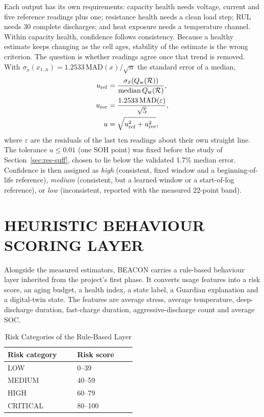 Each output has its own requirements: capacity health needs voltage, current and five reference readings plus one; resistance health needs a clean load step; RUL needs 30 complete discharges; and heat exposure needs a temperature channel. Within capacity health, confidence follows consistency. Because a healthy estimate keeps changing as the cell ages, stability of the estimate is the wrong criterion. The question is whether readings agree once that trend is removed. With $\sigma_{\tilde x}(x_{1..n}) = 1.2533\,\mathrm{MAD}(x)/\sqrt{n}$ the standard error of a median,
\begin{align}
u_\mathrm{ref} &= \frac{\sigma_{\tilde x}\!\left(Q_{\mathrm{w}}(\mathcal{R})\right)}{\operatorname{median}Q_{\mathrm{w}}(\mathcal{R})}, \\
u_\mathrm{rec} &= \frac{1.2533\,\mathrm{MAD}(\varepsilon)}{\sqrt{5}}, \\
u &= \sqrt{u_\mathrm{ref}^2 + u_\mathrm{rec}^2},
\label{eq:u}
\end{align}
where $\varepsilon$ are the residuals of the last ten readings about their own straight line. The tolerance $u \le 0.01$ (one SOH point) was fixed before the study of Section~\ref{sec:res-suff}, chosen to lie below the validated 1.7\% median error. Confidence is then assigned as \emph{high} (consistent, fixed window and a beginning-of-life reference), \emph{medium} (consistent, but a learned window or a start-of-log reference), or \emph{low} (inconsistent, reported with the measured 22-point band).

\section{HEURISTIC BEHAVIOUR SCORING LAYER}
\label{sec:behaviour}

Alongside the measured estimators, BEACON carries a rule-based behaviour layer inherited from the project's first phase. It converts usage features into a risk score, an aging budget, a health index, a state label, a Guardian explanation and a digital-twin state. The features are average stress, average temperature, deep-discharge duration, fast-charge duration, aggressive-discharge count and average SOC.

\begin{table}[htbp]
	\caption{Risk Categories of the Rule-Based Layer}
	\centering
	\small
	\renewcommand{\arraystretch}{1.15}
	\setlength{\tabcolsep}{4pt}
	\begin{tabular}{|C{0.25\linewidth}|C{0.25\linewidth}|}
		\hline
		\textbf{Risk category} & \textbf{Risk score} \\
		\hline
		LOW & 0--39 \\
		\hline
		MEDIUM & 40--59 \\
		\hline
		HIGH & 60--79 \\
		\hline
		CRITICAL & 80--100 \\
		\hline
	\end{tabular}
	\label{tab:risk}
\end{table}

